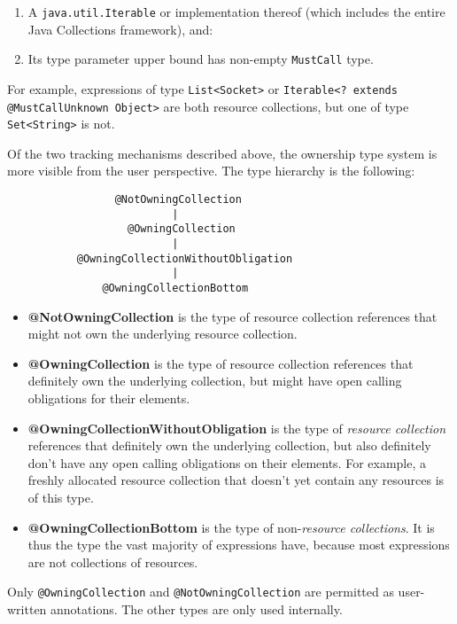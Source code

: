 \begin{enumerate}
  \item A \texttt{java.util.Iterable} or implementation thereof (which includes the entire Java Collections framework), and:%
  \item Its type parameter upper bound has non-empty \texttt{MustCall} type.
\end{enumerate}

For example, expressions of type \texttt{List<Socket>} or \texttt{Iterable<? extends @MustCallUnknown Object>} are both resource collections, but one of type \texttt{Set<String>} is not.

Of the two tracking mechanisms described above, the ownership type system is more visible from the user perspective. The type hierarchy is the following:

\begin{verbatim}
                 @NotOwningCollection
                          |
                   @OwningCollection
                          |
           @OwningCollectionWithoutObligation
                          |
               @OwningCollectionBottom
\end{verbatim}

\begin{itemize}
  \item \textbf{@NotOwningCollection} is the type of resource collection references that might not own the underlying resource collection.
  \item \textbf{@OwningCollection} is the type of resource collection references that definitely own the underlying collection, but might have open calling obligations for their elements.
  \item \textbf{@OwningCollectionWithoutObligation} is the type of \textit{resource collection} references that definitely own the underlying collection, but also definitely don't have any open calling obligations on their elements. For example, a freshly allocated resource collection that doesn't yet contain any resources is of this type.
  \item \textbf{@OwningCollectionBottom} is the type of non-\textit{resource collections}. It is thus the type the vast majority of expressions have, because most expressions are not collections of resources.
\end{itemize}

Only \texttt{@OwningCollection} and \texttt{@NotOwningCollection} are permitted as user-written annotations. The other types are only used internally.

